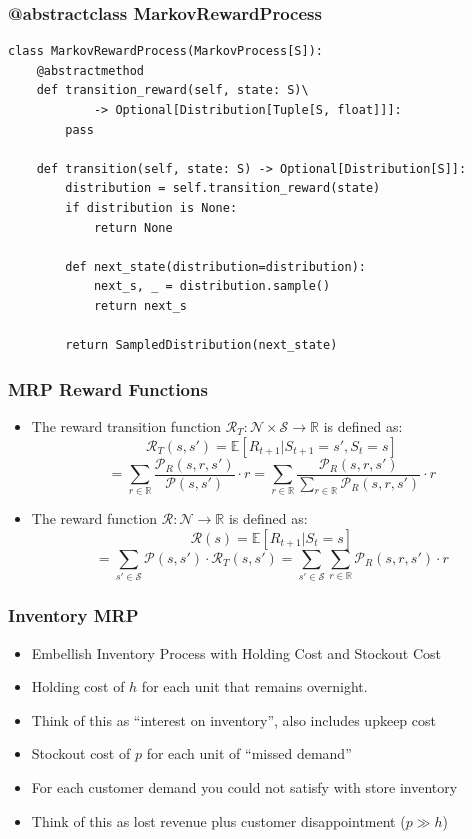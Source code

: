 \documentclass[handout]{beamer}
\begin{document}
\begin{frame}[fragile]
\frametitle{@abstractclass MarkovRewardProcess}
\pause
\begin{lstlisting}
class MarkovRewardProcess(MarkovProcess[S]):
    @abstractmethod
    def transition_reward(self, state: S)\
            -> Optional[Distribution[Tuple[S, float]]]:
        pass
        
    def transition(self, state: S) -> Optional[Distribution[S]]:
        distribution = self.transition_reward(state)
        if distribution is None:
            return None

        def next_state(distribution=distribution):
            next_s, _ = distribution.sample()
            return next_s

        return SampledDistribution(next_state)    
\end{lstlisting}
\end{frame}

\begin{frame}
\frametitle{MRP Reward Functions}
\pause
\begin{itemize}[<+->]
\item The reward transition function $\mathcal{R}_T: \mathcal{N} \times \mathcal{S} \rightarrow \mathbb{R}$ is defined as:
$$\mathcal{R}_T(s,s') = \mathbb{E}[R_{t+1}|S_{t+1}=s',S_t=s]$$
$$ = \sum_{r\in \mathbb{R}} \frac {\mathcal{P}_R(s,r,s')} {\mathcal{P}(s,s')} \cdot r = \sum_{r\in \mathbb{R}} \frac {\mathcal{P}_R(s,r,s')} {\sum_{r\in \mathbb{R}} \mathcal{P}_R(s,r,s')} \cdot r$$
\item The reward function $\mathcal{R}: \mathcal{N} \rightarrow \mathbb{R}$ is defined as:
$$\mathcal{R}(s) = \mathbb{E}[R_{t+1}|S_t=s]$$
$$ = \sum_{s' \in \mathcal{S}} \mathcal{P}(s,s') \cdot \mathcal{R}_T(s,s') = \sum_{s'\in \mathcal{S}} \sum_{r\in\mathbb{R}} \mathcal{P}_R(s,r,s') \cdot r$$
\end{itemize}
\end{frame}

\begin{frame}
\frametitle{Inventory MRP}
\pause
\begin{itemize}[<+->]
\item Embellish Inventory Process with Holding Cost and Stockout Cost
\item Holding cost of $h$ for each unit that remains overnight.
\item Think of this as ``interest on inventory'', also includes upkeep cost
\item Stockout cost of $p$ for each unit of ``missed demand''
\item For each customer demand you could not satisfy with store inventory
\item Think of this as lost revenue plus customer disappointment ($p \gg h$)
\end{itemize}
\end{frame}
\end{document}
